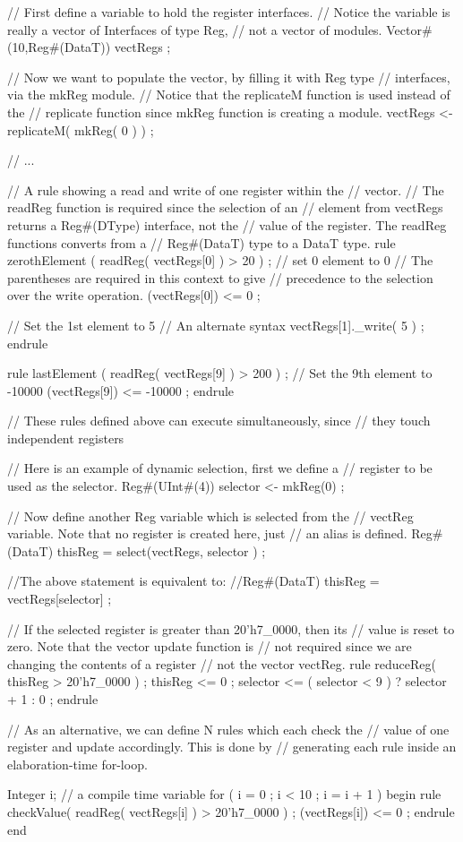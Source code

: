 \begin{libverbatim}
   // First define a variable to hold the register interfaces. 
   // Notice the variable is really a vector of Interfaces of type Reg,
   // not a vector of modules.
   Vector#(10,Reg#(DataT))   vectRegs ;

   // Now we want to populate the vector, by filling it with Reg type
   // interfaces, via the mkReg module.
   // Notice that the replicateM function is used instead of the
   // replicate function since mkReg function is creating a module.
   vectRegs <- replicateM( mkReg( 0 ) ) ;

   // ...

   // A rule showing a read and write of one register within the
   // vector.
   // The readReg function is required since the selection of an
   // element from vectRegs returns a Reg#(DType) interface, not the
   // value of the register.  The readReg functions converts from a
   // Reg#(DataT) type to a DataT type. 
   rule zerothElement ( readReg( vectRegs[0] ) > 20 ) ;
      // set 0 element to 0
      // The parentheses are required in this context to give
      // precedence to the selection over the write operation.
      (vectRegs[0]) <= 0 ;
      
      // Set the 1st element to 5
      // An alternate syntax 
      vectRegs[1]._write( 5 ) ;
   endrule

   rule lastElement ( readReg( vectRegs[9] ) > 200 ) ;
      // Set the 9th element to -10000
      (vectRegs[9]) <= -10000 ;
   endrule
   
   // These rules defined above can execute simultaneously, since
   // they touch independent registers

   // Here is an example of dynamic selection,  first we define a
   // register to be used as the selector. 
   Reg#(UInt#(4))  selector <- mkReg(0) ;

   // Now define another Reg variable which is selected from the
   // vectReg variable.  Note that no register is created here, just
   // an alias is defined.
   Reg#(DataT)  thisReg = select(vectRegs, selector ) ;
   
   //The above statement is equivalent to:
   //Reg#(DataT) thisReg = vectRegs[selector] ;


   // If the selected register is greater than 20'h7_0000, then its
   // value is reset to zero.  Note that the vector update function is
   // not required since we are changing the contents of a register
   // not the vector vectReg.
   rule reduceReg( thisReg > 20'h7_0000 ) ;
      thisReg <= 0 ;
      selector <= ( selector < 9 ) ? selector + 1 : 0 ;
   endrule

   // As an alternative, we can define N rules which each check the
   // value of one register and update accordingly.  This is done by
   // generating each rule inside an elaboration-time for-loop.
   
   Integer i;  // a compile time variable 
   for ( i = 0 ; i < 10 ; i = i + 1 ) begin
      rule checkValue( readReg( vectRegs[i] ) > 20'h7_0000 ) ;
         (vectRegs[i]) <= 0 ;
      endrule
   end
\end{libverbatim}



